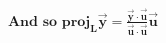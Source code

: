 \documentclass[preview]{standalone}
\begin{document}
\begin{align*}
\textbf{And so} \,\, \textbf{proj}_{\mathbf{L}}\mathbf{\vec{y}}  = \frac{\mathbf{\vec{y}} \cdot \mathbf{\vec{u}}}{\mathbf{\vec{u}} \cdot \mathbf{\vec{u}}} \mathbf{\vec{u}}
\end{align*}
\end{document}
